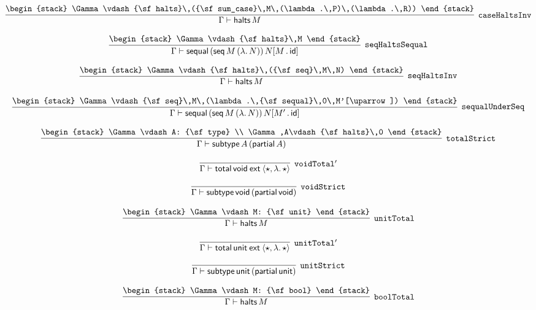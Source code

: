 \[
\infer[{\tt caseHaltsInv}]{\Gamma \vdash {\sf halts}\,M}{
\begin{stack}
\Gamma \vdash {\sf halts}\,({\sf sum_case}\,M\,(\lambda .\,P)\,(\lambda .\,R))
\end{stack}}
\]

\[
\infer[{\tt seqHaltsSequal}]{\Gamma \vdash {\sf sequal}\,({\sf seq}\,M\,(\lambda .\,N))\,N[M\,.\,{\sf id}]}{
\begin{stack}
\Gamma \vdash {\sf halts}\,M
\end{stack}}
\]

\[
\infer[{\tt seqHaltsInv}]{\Gamma \vdash {\sf halts}\,M}{
\begin{stack}
\Gamma \vdash {\sf halts}\,({\sf seq}\,M\,N)
\end{stack}}
\]

\[
\infer[{\tt sequalUnderSeq}]{\Gamma \vdash {\sf sequal}\,({\sf seq}\,M\,(\lambda .\,N))\,N[M'\,.\,{\sf id}]}{
\begin{stack}
\Gamma \vdash {\sf seq}\,M\,(\lambda .\,{\sf sequal}\,0\,M'[\uparrow ])
\end{stack}}
\]

\[
\infer[{\tt totalStrict}]{\Gamma \vdash {\sf subtype}\,A\,({\sf partial}\,A)}{
\begin{stack}
\Gamma \vdash A: {\sf type}
\\
\Gamma ,A\vdash {\sf halts}\,0
\end{stack}}
\]

\[
\infer[{\tt voidTotal'}]{\Gamma \vdash {\sf total}\,{\sf void}\:{\sf ext}\:\langle \star ,\lambda .\,\star \rangle }{}
\]

\[
\infer[{\tt voidStrict}]{\Gamma \vdash {\sf subtype}\,{\sf void}\,({\sf partial}\,{\sf void})}{}
\]

\[
\infer[{\tt unitTotal}]{\Gamma \vdash {\sf halts}\,M}{
\begin{stack}
\Gamma \vdash M: {\sf unit}
\end{stack}}
\]

\[
\infer[{\tt unitTotal'}]{\Gamma \vdash {\sf total}\,{\sf unit}\:{\sf ext}\:\langle \star ,\lambda .\,\star \rangle }{}
\]

\[
\infer[{\tt unitStrict}]{\Gamma \vdash {\sf subtype}\,{\sf unit}\,({\sf partial}\,{\sf unit})}{}
\]

\[
\infer[{\tt boolTotal}]{\Gamma \vdash {\sf halts}\,M}{
\begin{stack}
\Gamma \vdash M: {\sf bool}
\end{stack}}
\]

